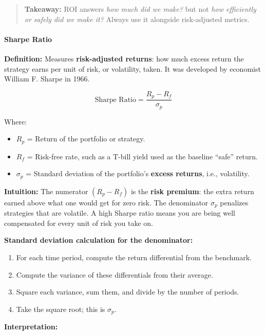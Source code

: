 \documentclass[12pt,openany]{book}
\begin{document}
\begin{quote}
    \textbf{Takeaway:} ROI answers \emph{how much did we make?} but not \emph{how efficiently or safely did we make it?} Always use it alongside risk-adjusted metrics.
\end{quote}

\paragraph{Sharpe Ratio}

\textbf{Definition:} Measures \textbf{risk-adjusted returns}: how much excess return the strategy earns per unit of risk, or volatility, taken. It was developed by economist William F. Sharpe in 1966.

\begin{equation*}
    \text{Sharpe Ratio} = \frac{R_p - R_f}{\sigma_p}
\end{equation*}

Where:
\begin{itemize}[leftmargin=*]
    \item $R_p$ = Return of the portfolio or strategy.
    \item $R_f$ = Risk-free rate, such as a T-bill yield used as the baseline ``safe'' return.
    \item $\sigma_p$ = Standard deviation of the portfolio's \textbf{excess returns}, i.e., volatility.
\end{itemize}

\textbf{Intuition:} The numerator $(R_p - R_f)$ is the \textbf{risk premium}: the extra return earned above what one would get for zero risk. The denominator $\sigma_p$ penalizes strategies that are volatile. A high Sharpe ratio means you are being well compensated for every unit of risk you take on.

\textbf{Standard deviation calculation for the denominator:}
\begin{enumerate}[leftmargin=*]
    \item For each time period, compute the return differential from the benchmark.
    \item Compute the variance of these differentials from their average.
    \item Square each variance, sum them, and divide by the number of periods.
    \item Take the square root; this is $\sigma_p$.
\end{enumerate}

\textbf{Interpretation:}
\end{document}
